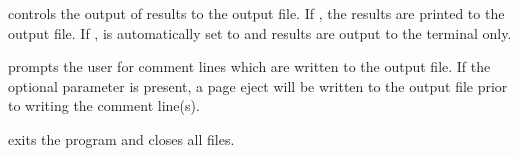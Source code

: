 \filbreak
{} {
 controls the output of results to the output file.  If
, the results are printed to the output file. If ,
 is automatically set to  and results are output to
the terminal only.
}

\filbreak
{} {
 prompts the user for  comment lines which
are written to the output file.  If the optional parameter  is
present, a page eject will be written to the output file prior to
writing the comment line(s).
}

\filbreak
{} {
 exits the program and closes all files.
}
